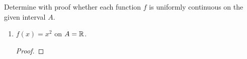 \documentclass[../main.tex]{subfiles}
\begin{document}
\begin{exercise}\label{exr:13.3}
    Determine with proof whether each function $f$ is uniformly continuous on the given interval $A$.
    \begin{enumerate}[label={(\alph*)}]
        \item $f(x)=x^2$ on $A=\mathbb{R}$.
        \begin{proof}


\end{proof}
\end{enumerate}
\end{exercise}
\end{document}
